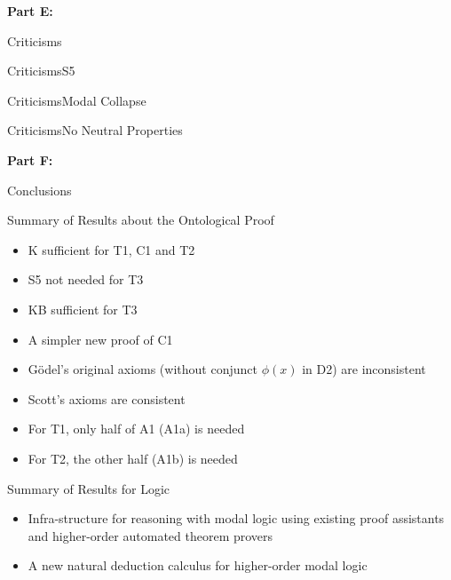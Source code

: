 \begin{transitionframe}
\textbf{Part E:}

Criticisms
\end{transitionframe}

\begin{frame}{Criticisms}{S5}

\end{frame}


\begin{frame}{Criticisms}{Modal Collapse}

\end{frame}


\begin{frame}{Criticisms}{No Neutral Properties}

\end{frame}



\begin{transitionframe}
\textbf{Part F:}

Conclusions
\end{transitionframe}



\begin{frame}{Summary of Results about the Ontological Proof}
\begin{itemize}[<+->]
\item K sufficient for T1, C1 and T2 
\item S5 not needed for T3
\item KB sufficient for T3 
\item A simpler new proof of C1
\item G\"odel's original axioms (without conjunct $\phi(x)$ in D2) are inconsistent
\item Scott's axioms are consistent
\item For T1, only half of A1 (A1a) is needed 
\item For T2, the other half (A1b) is needed
\end{itemize}
\end{frame}


\begin{frame}{Summary of Results for Logic} \small
\begin{itemize}[<+->]
\item Infra-structure for reasoning with modal logic using existing proof assistants and higher-order automated theorem provers
\item A new natural deduction calculus for higher-order modal logic
\end{itemize}
\end{frame}

